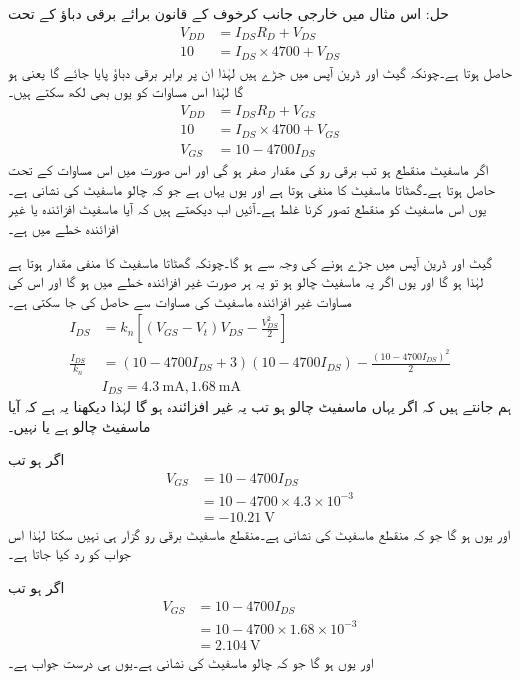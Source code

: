 حل:	اس مثال میں خارجی جانب کرخوف کے قانون برائے برقی دباؤ کے تحت
\begin{align*}
V_{DD}&=I_{DS}R_D+V_{DS}\\
10&=I_{DS}\times 4700+V_{DS}
\end{align*}
حاصل ہوتا ہے۔چونکہ گیٹ اور ڈرین آپس میں جڑے ہیں لہٰذا ان پر برابر برقی دباؤ پایا جائے گا یعنی   ہو گا لہٰذا اس مساوات کو یوں بھی لکھ سکتے ہیں۔
\begin{align*}
V_{DD}&=I_{DS}R_D+V_{GS}\\
10&=I_{DS} \times 4700+V_{GS}\\
V_{GS}&=10-4700 I_{DS}
\end{align*}
اگر ماسفیٹ منقطع ہو تب برقی رو کی مقدار صفر ہو گی اور اس صورت میں اس مساوات کے تحت   حاصل ہوتا ہے۔گھٹاتا ماسفیٹ کا    منفی ہوتا ہے اور یوں یہاں  ہے جو کہ چالو ماسفیٹ کی نشانی ہے۔یوں اس ماسفیٹ کو منقطع تصور کرنا غلط ہے۔آئیں اب دیکھتے ہیں کہ آیا ماسفیٹ افزائندہ یا غیر افزائندہ خطے میں ہے۔

گیٹ اور ڈرین آپس میں جڑے ہونے کی وجہ سے  ہو گا۔چونکہ گھٹاتا ماسفیٹ کا  منفی مقدار ہوتا ہے لہٰذا   ہو گا اور یوں اگر یہ ماسفیٹ چالو  ہو تو یہ ہر صورت  غیر افزائندہ خطے میں ہو گا اور اس کی مساوات غیر افزائندہ ماسفیٹ کی مساوات سے حاصل کی جا سکتی ہے۔
\begin{align*}
I_{DS}&=k_n \left[\left(V_{GS}-V_t \right )V_{DS}-\frac{V_{DS}^2}{2}\right]\\
\frac{I_{DS}}{k_n}&=\left(10-4700 I_{DS}+3 \right )(10-4700I_{DS})-\frac{(10-4700I_{DS})^2}{2}\\
& I_{DS}=\SI{4.3}{\milli \ampere} , \SI{1.68}{\milli \ampere}
\end{align*}
ہم جانتے ہیں کہ اگر یہاں ماسفیٹ چالو ہو تب یہ غیر افزائندہ ہو گا لہٰذا دیکھنا یہ ہے کہ آیا ماسفیٹ چالو ہے یا نہیں۔

اگر  ہو تب 	
\begin{align*}
V_{GS}&=10-4700 I_{DS}\\
&=10-4700 \times 4.3 \times 10^{-3}\\
&=\SI{-10.21}{\volt}
\end{align*}
اور یوں  ہو گا جو کہ منقطع ماسفیٹ کی نشانی ہے۔منقطع ماسفیٹ برقی رو گزار ہی نہیں سکتا لہٰذا اس جواب کو رد کیا جاتا ہے۔

اگر  ہو تب 	
\begin{align*}
V_{GS}&=10-4700 I_{DS}\\
&=10-4700 \times 1.68 \times 10^{-3}\\
&=\SI{2.104}{\volt}
\end{align*}
اور یوں  ہو گا جو کہ چالو ماسفیٹ کی نشانی ہے۔یوں  ہی درست جواب ہے۔

